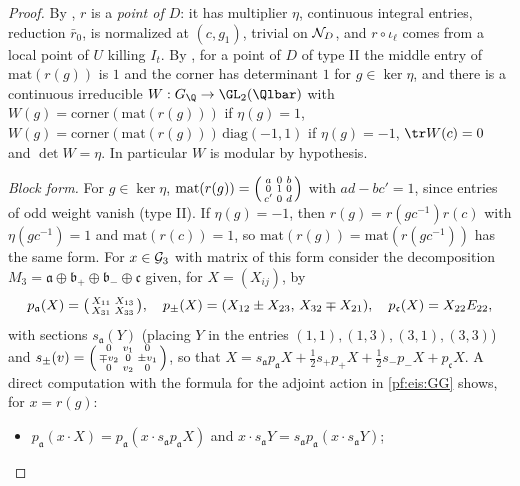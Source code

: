 \begin{proof}
By , $r$ is a \emph{point of $D$}: it has multiplier $\eta$, continuous integral entries,
reduction $\bar r_0$, is normalized at $(c,g_1)$, trivial on $\mathcal N_D$, and $r\circ\iota_\ell$ comes from a local point of $U$
killing $I_t$. By , for a point of $D$ of type II the middle entry of $\mathrm{mat}(r(g))$ is
$1$ and the corner has determinant $1$ for $g\in\ker\eta$, and there is a continuous irreducible $W:G_\Q\to\GL_2(\Qlbar)$ with
$W(g)=\mathrm{corner}(\mathrm{mat}(r(g)))$ if $\eta(g)=1$, $W(g)=\mathrm{corner}(\mathrm{mat}(r(g)))\,\mathrm{diag}(-1,1)$ if $\eta(g)=-1$,
$\tr W(c)=0$ and $\det W=\eta$. In particular $W$ is modular by hypothesis.

\emph{Block form.} For $g\in\ker\eta$, $\mathrm{mat}(r(g))=\begin{psmallmatrix}a&0&b\\0&1&0\\c'&0&d\end{psmallmatrix}$ with $ad-bc'=1$,
since entries of odd weight vanish (type II). If $\eta(g)=-1$, then $r(g)=r(gc^{-1})r(c)$ with $\eta(gc^{-1})=1$ and
$\mathrm{mat}(r(c))=1$, so $\mathrm{mat}(r(g))=\mathrm{mat}(r(gc^{-1}))$ has the same form. For $x\in\mathcal G_3$ with matrix of this form
consider the decomposition $M_3=\mathfrak a\oplus\mathfrak b_+\oplus\mathfrak b_-\oplus\mathfrak c$ given, for $X=(X_{ij})$, by
\[
 p_{\mathfrak a}(X)=\begin{psmallmatrix}X_{11}&X_{13}\\X_{31}&X_{33}\end{psmallmatrix},\quad
 p_\pm(X)=(X_{12}\pm X_{23},\,X_{32}\mp X_{21}),\quad p_{\mathfrak c}(X)=X_{22}E_{22},
\]
with sections $s_{\mathfrak a}(Y)$ (placing $Y$ in the entries $(1,1),(1,3),(3,1),(3,3)$) and
$s_\pm(v)=\begin{psmallmatrix}0&v_1&0\\\mp v_2&0&\pm v_1\\0&v_2&0\end{psmallmatrix}$, so that
$X=s_{\mathfrak a}p_{\mathfrak a}X+\tfrac12s_+p_+X+\tfrac12s_-p_-X+p_{\mathfrak c}X$. A direct computation with the formula for the
adjoint action in \cref{pf:eis:GG} shows, for $x=r(g)$:
\begin{itemize}
\item $p_{\mathfrak a}(x\cdot X)=p_{\mathfrak a}(x\cdot s_{\mathfrak a}p_{\mathfrak a}X)$ and $x\cdot s_{\mathfrak a}Y=s_{\mathfrak a}p_{\mathfrak a}(x\cdot s_{\mathfrak a}Y)$;

\end{itemize}
\end{proof}
